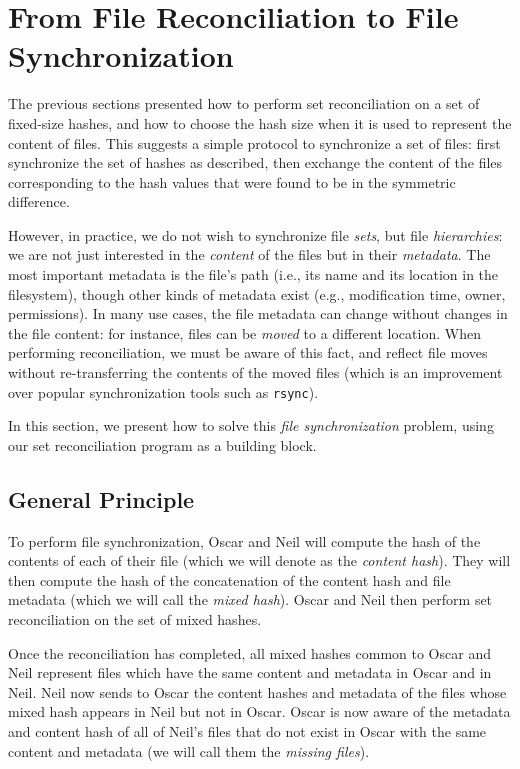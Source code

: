 \documentclass[11pt]{llncs}
\newcommand{\rsync}{\texttt{rsync}\xspace}
\begin{document}
\section{From File Reconciliation to File Synchronization}
\label{files}

The previous sections presented how to perform set reconciliation on a set of
fixed-size hashes, and how to choose the hash size when it is used to represent
the content of files. This suggests a simple protocol to synchronize a set of
files: first synchronize the set of hashes as described, then exchange the
content of the files corresponding to the hash values that were found to be in
the symmetric difference.

However, in practice, we do not wish to synchronize file \emph{sets}, but file
\emph{hierarchies}: we are not just interested in the \emph{content} of the
files but in their \emph{metadata}. The most important metadata is the file's
path (i.e., its name and its location in the filesystem), though other kinds of
metadata exist (e.g., modification time, owner, permissions). In many use
cases, the file metadata can change without changes in the file content: for
instance, files can be \emph{moved} to a different location. When performing
reconciliation, we must be aware of this fact, and reflect file moves without
re-transferring the contents of the moved files (which is an improvement over
popular synchronization tools such as \rsync).

In this section, we present how to solve this \emph{file synchronization}
problem, using our set reconciliation program as a building block.

\subsection{General Principle}

To perform file synchronization, Oscar and Neil will compute the hash of the
contents of each of their file (which we will denote as the \emph{content
hash}). They will then compute the hash of the concatenation of the content hash
and file metadata (which we will call the \emph{mixed hash}). Oscar and Neil
then perform set reconciliation on the set of mixed hashes.

Once the reconciliation has completed, all mixed hashes common to Oscar and Neil
represent files which have the same content and metadata in Oscar and in Neil.
Neil now sends to Oscar the content hashes and metadata of the files whose mixed
hash appears in Neil but not in Oscar. Oscar is now aware of the metadata and
content hash of all of Neil's files that do not exist in Oscar with the same
content and metadata (we will call them the \emph{missing files}).
\end{document}
